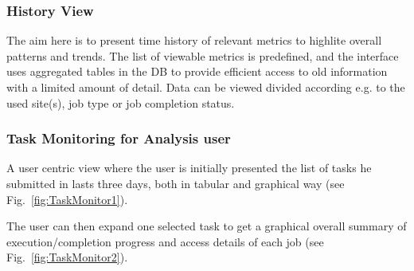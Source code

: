 \subsubsection{History View}
The aim here is to present time history of relevant
metrics to highlite overall patterns and trends.%
The list of viewable metrics is predefined, and
the interface uses aggregated tables in the DB to provide
efficient access to old information with a limited
amount of detail. Data can be viewed divided
according e.g. to the used site(s), job type or job completion status.


\subsubsection{Task Monitoring for Analysis user}
A user centric view where the user is
initially presented the list of tasks he submitted in lasts
three days, both in tabular and graphical way (see Fig.~\ref{fig:TaskMonitor1}).

The user can then expand one selected task to get
a graphical overall summary of execution/completion progress
and access details of each job (see Fig.~\ref{fig:TaskMonitor2}).

